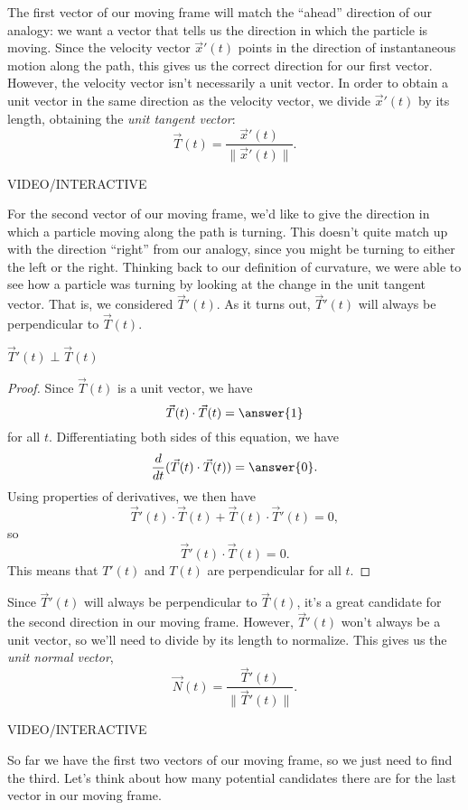 \documentclass{ximera}
\begin{document}
The first vector of our moving frame will match the ``ahead'' direction of our analogy: we want a vector that tells us the direction in which the particle is moving. Since the velocity vector $\vec{x}'(t)$ points in the direction of instantaneous motion along the path, this gives us the correct direction for our first vector. However, the velocity vector isn't necessarily a unit vector. In order to obtain a unit vector in the same direction as the velocity vector, we divide $\vec{x}'(t)$ by its length, obtaining the \emph{unit tangent vector}:
\[
\vec{T}(t) = \dfrac{\vec{x}'(t)}{\|\vec{x}'(t)\|}.
\]

VIDEO/INTERACTIVE

For the second vector of our moving frame, we'd like to give the direction in which a particle moving along the path is turning. This doesn't quite match up with the direction ``right'' from our analogy, since you might be turning to either the left or the right. Thinking back to our definition of curvature, we were able to see how a particle was turning by looking at the change in the unit tangent vector. That is, we considered $\vec{T}'(t)$. As it turns out, $\vec{T}'(t)$ will always be perpendicular to $\vec{T}(t)$.

\begin{proposition}
$\vec{T}'(t)\perp \vec{T}(t)$
\end{proposition}

\begin{proof}
Since $\vec{T}(t)$ is a unit vector, we have
\[
\vec{T}(t)\cdot \vec{T}(t) = \answer{1}
\]
for all $t$. Differentiating both sides of this equation, we have
\[
\frac{d}{dt}(\vec{T}(t)\cdot \vec{T}(t)) = \answer{0}.
\]
Using properties of derivatives, we then have
\[
\vec{T}'(t)\cdot \vec{T}(t) + \vec{T}(t)\cdot \vec{T}'(t)=0,
\]
so
\[
\vec{T}'(t)\cdot \vec{T}(t) = 0.
\]
This means that $T'(t)$ and $T(t)$ are perpendicular for all $t$.
\end{proof}

 Since $\vec{T}'(t)$ will always be perpendicular to $\vec{T}(t)$, it's a great candidate for the second direction in our moving frame. However, $\vec{T}'(t)$ won't always be a unit vector, so we'll need to divide by its length to normalize. This gives us the \emph{unit normal vector},
 \[
 \vec{N}(t) = \dfrac{\vec{T}'(t)}{\|\vec{T}'(t)\|}.
 \]
 
 VIDEO/INTERACTIVE
 
 So far we have the first two vectors of our moving frame, so we just need to find the third. Let's think about how many potential candidates there are for the last vector in our moving frame.
 
\end{document}
